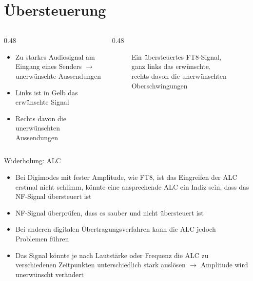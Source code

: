 
\section{Übersteuerung}
\label{section:digimod_uebersteuerung}
\begin{frame}%

\begin{columns}
    \begin{column}{0.48\textwidth}
    \begin{itemize}
  \item Zu starkes Audiosignal am Eingang eines Senders $\rightarrow$ unerwünschte Aussendungen
  \item Links ist in Gelb das erwünschte Signal
  \item Rechts davon die unerwünschten Aussendungen
  \end{itemize}

    \end{column}
   \begin{column}{0.48\textwidth}
       
\begin{figure}
    \caption{\scriptsize Ein übersteuertes FT8-Signal, ganz links das erwünschte, rechts davon die unerwünschten Oberschwingungen}
    \label{uebersteuerung_ft8}
\end{figure}


   \end{column}
\end{columns}

\end{frame}

\begin{frame}{Widerholung: ALC}
    \begin{itemize}
        \item Bei Digimodes mit fester Amplitude, wie FT8, ist das Eingreifen
        der ALC erstmal nicht schlimm, könnte eine ansprechende ALC ein Indiz
        sein, dass das NF-Signal übersteuert ist
        \item NF-Signal überprüfen, dass es sauber und nicht übersteuert ist
        \item Bei anderen digitalen Übertragungsverfahren kann die ALC jedoch
        Problemen führen
        \item Das Signal könnte je nach Lautstärke oder Frequenz die ALC zu
        verschiedenen Zeitpunkten unterschiedlich stark auslösen $\rightarrow$
        Amplitude wird unerwünscht verändert
    \end{itemize}
\end{frame}

